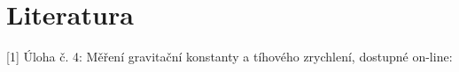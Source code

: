 \documentclass[czech,11pt,a4paper]{article}
\begin{document}
\section{Literatura}
[1] Úloha č. 4: Měření gravitační konstanty a tíhového zrychlení, dostupné on-line: \\ 

	
\end{document}
